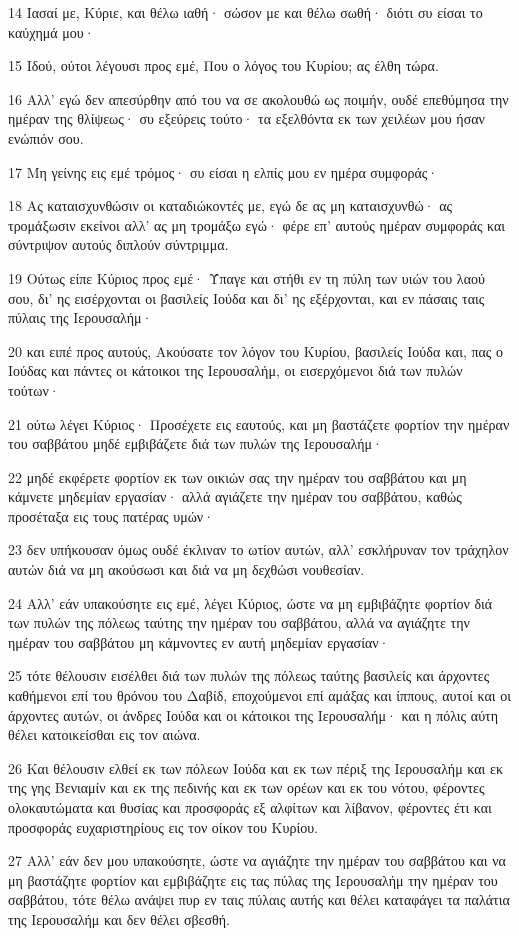 \par 14 Ιασαί με, Κύριε, και θέλω ιαθή· σώσον με και θέλω σωθή· διότι συ είσαι το καύχημά μου·
\par 15 Ιδού, ούτοι λέγουσι προς εμέ, Που ο λόγος του Κυρίου; ας έλθη τώρα.
\par 16 Αλλ' εγώ δεν απεσύρθην από του να σε ακολουθώ ως ποιμήν, ουδέ επεθύμησα την ημέραν της θλίψεως· συ εξεύρεις τούτο· τα εξελθόντα εκ των χειλέων μου ήσαν ενώπιόν σου.
\par 17 Μη γείνης εις εμέ τρόμος· συ είσαι η ελπίς μου εν ημέρα συμφοράς·
\par 18 Ας καταισχυνθώσιν οι καταδιώκοντές με, εγώ δε ας μη καταισχυνθώ· ας τρομάξωσιν εκείνοι αλλ' ας μη τρομάξω εγώ· φέρε επ' αυτούς ημέραν συμφοράς και σύντριψον αυτούς διπλούν σύντριμμα.
\par 19 Ούτως είπε Κύριος προς εμέ· Ύπαγε και στήθι εν τη πύλη των υιών του λαού σου, δι' ης εισέρχονται οι βασιλείς Ιούδα και δι' ης εξέρχονται, και εν πάσαις ταις πύλαις της Ιερουσαλήμ·
\par 20 και ειπέ προς αυτούς, Ακούσατε τον λόγον του Κυρίου, βασιλείς Ιούδα και, πας ο Ιούδας και πάντες οι κάτοικοι της Ιερουσαλήμ, οι εισερχόμενοι διά των πυλών τούτων·
\par 21 ούτω λέγει Κύριος· Προσέχετε εις εαυτούς, και μη βαστάζετε φορτίον την ημέραν του σαββάτου μηδέ εμβιβάζετε διά των πυλών της Ιερουσαλήμ·
\par 22 μηδέ εκφέρετε φορτίον εκ των οικιών σας την ημέραν του σαββάτου και μη κάμνετε μηδεμίαν εργασίαν· αλλά αγιάζετε την ημέραν του σαββάτου, καθώς προσέταξα εις τους πατέρας υμών·
\par 23 δεν υπήκουσαν όμως ουδέ έκλιναν το ωτίον αυτών, αλλ' εσκλήρυναν τον τράχηλον αυτών διά να μη ακούσωσι και διά να μη δεχθώσι νουθεσίαν.
\par 24 Αλλ' εάν υπακούσητε εις εμέ, λέγει Κύριος, ώστε να μη εμβιβάζητε φορτίον διά των πυλών της πόλεως ταύτης την ημέραν του σαββάτου, αλλά να αγιάζητε την ημέραν του σαββάτου μη κάμνοντες εν αυτή μηδεμίαν εργασίαν·
\par 25 τότε θέλουσιν εισέλθει διά των πυλών της πόλεως ταύτης βασιλείς και άρχοντες καθήμενοι επί του θρόνου του Δαβίδ, εποχούμενοι επί αμάξας και ίππους, αυτοί και οι άρχοντες αυτών, οι άνδρες Ιούδα και οι κάτοικοι της Ιερουσαλήμ· και η πόλις αύτη θέλει κατοικείσθαι εις τον αιώνα.
\par 26 Και θέλουσιν ελθεί εκ των πόλεων Ιούδα και εκ των πέριξ της Ιερουσαλήμ και εκ της γης Βενιαμίν και εκ της πεδινής και εκ των ορέων και εκ του νότου, φέροντες ολοκαυτώματα και θυσίας και προσφοράς εξ αλφίτων και λίβανον, φέροντες έτι και προσφοράς ευχαριστηρίους εις τον οίκον του Κυρίου.
\par 27 Αλλ' εάν δεν μου υπακούσητε, ώστε να αγιάζητε την ημέραν του σαββάτου και να μη βαστάζητε φορτίον και εμβιβάζητε εις τας πύλας της Ιερουσαλήμ την ημέραν του σαββάτου, τότε θέλω ανάψει πυρ εν ταις πύλαις αυτής και θέλει καταφάγει τα παλάτια της Ιερουσαλήμ και δεν θέλει σβεσθή.

